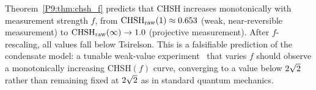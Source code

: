 \begin{remark}
\label{P9:rem:measurement_strength_observable}
Theorem~\ref{P9:thm:chsh_f} predicts that CHSH increases monotonically with
measurement strength $f$, from $\mathrm{CHSH}_\mathrm{raw}(1)\approx0.653$ (weak,
near-reversible measurement) to $\mathrm{CHSH}_\mathrm{raw}(\infty)\to1.0$
(projective measurement).
After $f$-rescaling, all values fall below Tsirelson.
This is a falsifiable prediction of the condensate model: a tunable
weak-value experiment~\cite{Paper8} that varies $f$ should observe
a monotonically increasing CHSH$(f)$ curve, converging to a value below
$2\sqrt{2}$ rather than remaining fixed at $2\sqrt{2}$ as in standard
quantum mechanics.
\end{remark}

